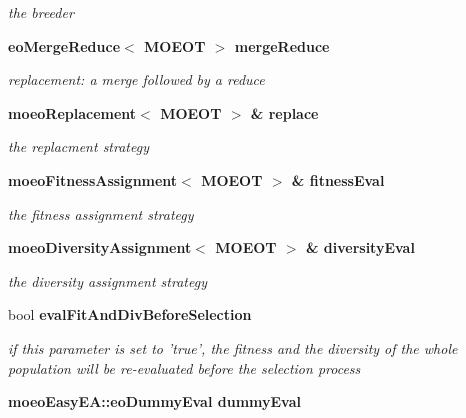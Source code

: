 \begin{CompactItemize}
\begin{CompactList}\small\item\em the breeder \item\end{CompactList}\item 
\bf{eo\-Merge\-Reduce}$<$ MOEOT $>$ \bf{merge\-Reduce}\label{classmoeoEasyEA_15a69654c07b24f9795add0a22f1f856}

\begin{CompactList}\small\item\em replacement: a merge followed by a reduce \item\end{CompactList}\item 
\bf{moeo\-Replacement}$<$ MOEOT $>$ \& \bf{replace}\label{classmoeoEasyEA_91611cf2862c2db953554e367a576244}

\begin{CompactList}\small\item\em the replacment strategy \item\end{CompactList}\item 
\bf{moeo\-Fitness\-Assignment}$<$ MOEOT $>$ \& \bf{fitness\-Eval}\label{classmoeoEasyEA_1268fc2f0b62fe51bca17d4efb51954b}

\begin{CompactList}\small\item\em the fitness assignment strategy \item\end{CompactList}\item 
\bf{moeo\-Diversity\-Assignment}$<$ MOEOT $>$ \& \bf{diversity\-Eval}\label{classmoeoEasyEA_b9d1b3790072dbbbe0012a252bab95f4}

\begin{CompactList}\small\item\em the diversity assignment strategy \item\end{CompactList}\item 
bool \bf{eval\-Fit\-And\-Div\-Before\-Selection}\label{classmoeoEasyEA_856a19d9a7c180fe33ce7a5bb010edcc}

\begin{CompactList}\small\item\em if this parameter is set to 'true', the fitness and the diversity of the whole population will be re-evaluated before the selection process \item\end{CompactList}\item 
\bf{moeo\-Easy\-EA::eo\-Dummy\-Eval} \bf{dummy\-Eval}\label{classmoeoEasyEA_16cbb12cb7de77c6d7d3f7aee9434880}


\end{CompactItemize}
